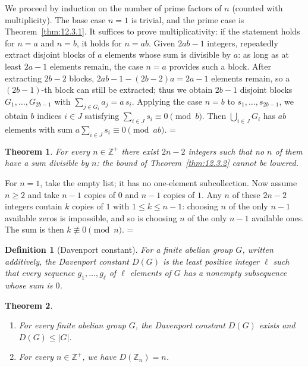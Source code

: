 \documentclass[11pt]{article}
\makeatletter
\theoremstyle{ntstyle}
\newtheorem{theorem}{Theorem}[subsection]
\newtheorem{definition}{Definition}[subsection]
\newcommand{\statementitems}{\mbox{}}
\let\nt@closedisplay\]
\def\nt@guardedclose{\@ifnextchar\par{\nt@closeafterpar}{\@ifnextchar\end{\postdisplaypenalty\@M\nt@closedisplay}{\nt@closedisplay}}}
\def\nt@closeafterpar\par{\@ifnextchar\par{\nt@closeafterpar}{\@ifnextchar\end{\postdisplaypenalty\@M\nt@closedisplay\par}{\nt@closedisplay\par}}}
\renewenvironment{proof}[1][\proofname]{\par
  \pushQED{\qed}\normalfont\topsep\medskipamount\edef\nt@afterproof{\@endparpenalty=\the\@endparpenalty\relax}\@beginparpenalty\@M\@endparpenalty\@M\let\]\nt@guardedclose\trivlist\item[]\textit{#1\@addpunct{.}} \ignorespaces}{\ifvmode\addpenalty\@M\fi\popQED\nt@afterproof\endtrivlist\@endpefalse}
\makeatother
\begin{document}
\begin{proof} We proceed by induction on the number of prime factors of $n$ (counted with
multiplicity). The base case $n = 1$ is trivial, and the
	prime case is Theorem~\ref{thm:12.3.1}. It suffices to prove multiplicativity:
	if the statement holds for $n = a$ and $n = b$, it holds for $n =
		ab$. Given $2ab - 1$ integers, repeatedly extract disjoint blocks of
	$a$ elements whose sum is divisible by $a$: as long as at least $2a -
		1$ elements remain, the case $n = a$ provides such a block. After
	extracting $2b - 2$ blocks, $2ab - 1 - (2b-2)a = 2a - 1$ elements
	remain, so a $(2b-1)$-th block can still be extracted; thus we obtain
	$2b - 1$ disjoint blocks $G_1, \ldots, G_{2b-1}$ with $\sum_{j \in
			G_i} a_j = a\, s_i$. Applying the case $n = b$ to $s_1, \ldots,
		s_{2b-1}$, we obtain $b$ indices $i \in J$ satisfying $\sum_{i \in J} s_i \equiv
		0 \pmod{b}$. Then $\bigcup_{i \in J} G_i$ has $ab$ elements with sum
	$a \sum_{i \in J} s_i \equiv 0 \pmod{ab}$.
\end{proof}
\begin{theorem}\label{thm:12.3.3} For every $n\in\mathbb{Z}^+$ there
	exist $2n - 2$ integers such that no $n$ of them have a sum divisible by $n$:
	the bound of Theorem~\ref{thm:12.3.2} cannot be lowered.
\end{theorem}

\begin{proof} For $n=1$, take the empty list; it has no one-element
	subcollection. Now assume $n\ge2$ and take $n - 1$ copies of $0$ and $n - 1$
	copies of $1$. Any $n$ of these $2n - 2$ integers contain $k$ copies
	of $1$ with $1\le k\le n - 1$: choosing $n$ of the only $n - 1$
	available zeros is impossible, and so is choosing $n$ of the only
	$n - 1$ available ones. The sum is then $k\not\equiv0\pmod{n}$.
\end{proof}
\begin{definition}[Davenport constant]\label{def:12.3.1} For a finite abelian group
	$G$, written additively, the Davenport constant $D(G)$ is the least
	positive integer $\ell$ such that every sequence $g_1, \ldots,
		g_\ell$ of $\ell$ elements of $G$ has a nonempty subsequence whose
	sum is $0$.
\end{definition}
\begin{theorem}\label{thm:12.3.4}\statementitems
	\begin{enumerate}[label={\alph*)}]
		\item For every finite abelian group $G$, the Davenport constant $D(G)$ exists and
					$D(G)\le|G|$.
		\item For every $n\in\mathbb{Z}^+$, we have $D(\mathbb{Z}_n)=n$.
	\end{enumerate}
\end{theorem}
\end{document}
